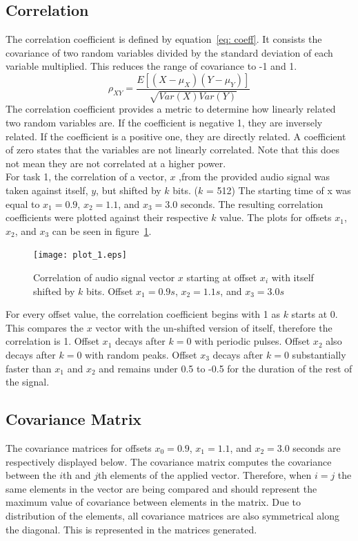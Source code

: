 \subsection{Correlation}  
The correlation coefficient is defined by equation~\ref{eq: coeff}. It consists the covariance of two random variables divided by the standard deviation of each variable multiplied. This reduces the range of covariance to -1 and 1. 
\begin{equation}
\rho_{XY} = \frac{E[(X-\mu_X)(Y-\mu_Y)]}{\sqrt{Var(X)Var(Y)}}
\label{eq: coeff}
\end{equation}
The correlation coefficient provides a metric to determine how linearly related two random variables are. If the coefficient is negative 1, they are inversely related. If the coefficient is a positive one, they are directly related. A coefficient of  zero states that the variables are not linearly correlated. Note that this does not mean they are not correlated at a higher power.  \\ 

For task 1, the correlation of a vector, $x$ ,from the provided audio signal was taken against itself,  $y$, but shifted by $k$ bits. ($k$ = 512) The starting time of x was equal to $x_1 = 0.9$, $x_2 = 1.1$, and $x_3 = 3.0$ seconds. The resulting correlation coefficients were plotted against their respective $k$ value. The plots for offsets $x_1$, $x_2 $, and $x_3$ can be seen in figure~\ref{fig: correlation}.


\begin{figure}[H] 
	\centering 
	\texttt{[image: plot\_1.eps]}
	\caption{Correlation of audio signal vector $x$ starting at offset $x_i$ with itself shifted by $k$ bits. Offset $x_1 = 0.9s$, $x_2 = 1.1s$, and $x_3 = 3.0s$}
	\label{fig: correlation} 
\end{figure}

For every offset value, the correlation coefficient begins with 1 as $k$ starts at 0. This compares the $x$ vector with the un-shifted version of itself, therefore the correlation is 1. Offset $x_1$ decays after $k=0$ with periodic pulses. Offset $x_2$ also decays after $k=0$ with random peaks. Offset $x_3$ decays after $k=0$ substantially faster than $x_1$ and $x_2$ and remains under 0.5 to -0.5 for the duration of the rest of the signal. 

\subsection{Covariance Matrix} 
The covariance matrices for offsets $x_0 = 0.9$, $x_1 = 1.1$, and $x_2 = 3.0$ seconds are respectively displayed below. The covariance matrix computes the covariance between the $i$th and $j$th elements of the applied vector. Therefore, when $i = j$ the same elements in the vector are being compared and should represent the maximum value of covariance between elements in the matrix. Due to distribution of the elements, all covariance matrices are also symmetrical along the diagonal. This is represented in the matrices generated. 

